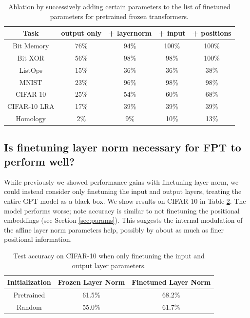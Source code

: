 \begin{table}[H]
\begin{center}
\begin{tabular}{c|cccc}
\toprule
\textbf{Task} & \multicolumn{1}{c}{\bf output only} & \multicolumn{1}{c}{\bf + layernorm} & \multicolumn{1}{c}{\bf + input} & \multicolumn{1}{c}{\bf + positions} \\
\midrule
Bit Memory & 76\% & 94\% & 100\% & 100\% \\
Bit XOR & 56\% & 98\% & 98\% & 100\% \\
ListOps & 15\% & 36\% & 36\% & 38\% \\
MNIST & 23\% & 96\% & 98\% & 98\% \\
CIFAR-10 & 25\% & 54\% & 60\% & 68\% \\
CIFAR-10 LRA & 17\% & 39\% & 39\% & 39\% \\
Homology & 2\% & 9\% & 10\% & 13\% \\
\bottomrule
\end{tabular}
\end{center}
\caption{Ablation by successively adding certain parameters to the list of finetuned parameters for pretrained frozen transformers.}\label{table:finetuning_add}
\end{table}

\subsection{Is finetuning layer norm necessary for FPT to perform well?}

While previously we showed performance gains with finetuning layer norm, we could instead consider only finetuning the input and output layers, treating the entire GPT model as a black box.
We show results on CIFAR-10 in Table \ref{table:nolayernorm}.
The model performs worse; note accuracy is similar to not finetuning the positional embeddings (see Section \ref{sec:params}).
This suggests the internal modulation of the affine layer norm parameters help, possibly by about as much as finer positional information.

\begin{table}[H] 
\begin{center}
\begin{tabular}{ccc}
\toprule
\textbf{Initialization} & \multicolumn{1}{c}{\bf Frozen Layer Norm} & \multicolumn{1}{c}{\bf Finetuned Layer Norm} \\
\midrule
Pretrained & 61.5\% & 68.2\%\\
Random     & 55.0\% & 61.7\% \\
\bottomrule
\end{tabular}
\end{center}
\caption{Test accuracy on CIFAR-10 when only finetuning the input and output layer parameters.}\label{table:nolayernorm}
\end{table}

